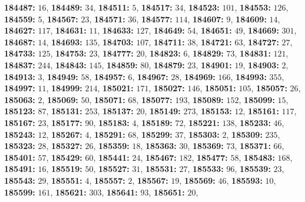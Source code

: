 \textsf{\bfseries 184487:} $16$, \textsf{\bfseries 184489:} $34$, \textsf{\bfseries 184511:} $5$, \textsf{\bfseries 184517:} $34$, \textsf{\bfseries 184523:} $101$, \textsf{\bfseries 184553:} $126$, \textsf{\bfseries 184559:} $5$, \textsf{\bfseries 184567:} $23$, \textsf{\bfseries 184571:} $36$, \textsf{\bfseries 184577:} $114$, \textsf{\bfseries 184607:} $9$, \textsf{\bfseries 184609:} $14$, \textsf{\bfseries 184627:} $117$, \textsf{\bfseries 184631:} $11$, \textsf{\bfseries 184633:} $127$, \textsf{\bfseries 184649:} $54$, \textsf{\bfseries 184651:} $49$, \textsf{\bfseries 184669:} $301$, \textsf{\bfseries 184687:} $14$, \textsf{\bfseries 184693:} $135$, \textsf{\bfseries 184703:} $107$, \textsf{\bfseries 184711:} $38$, \textsf{\bfseries 184721:} $63$, \textsf{\bfseries 184727:} $27$, \textsf{\bfseries 184733:} $125$, \textsf{\bfseries 184753:} $23$, \textsf{\bfseries 184777:} $20$, \textsf{\bfseries 184823:} $6$, \textsf{\bfseries 184829:} $73$, \textsf{\bfseries 184831:} $121$, \textsf{\bfseries 184837:} $244$, \textsf{\bfseries 184843:} $145$, \textsf{\bfseries 184859:} $80$, \textsf{\bfseries 184879:} $23$, \textsf{\bfseries 184901:} $19$, \textsf{\bfseries 184903:} $2$, \textsf{\bfseries 184913:} $3$, \textsf{\bfseries 184949:} $58$, \textsf{\bfseries 184957:} $6$, \textsf{\bfseries 184967:} $28$, \textsf{\bfseries 184969:} $166$, \textsf{\bfseries 184993:} $355$, \textsf{\bfseries 184997:} $11$, \textsf{\bfseries 184999:} $214$, \textsf{\bfseries 185021:} $171$, \textsf{\bfseries 185027:} $146$, \textsf{\bfseries 185051:} $105$, \textsf{\bfseries 185057:} $26$, \textsf{\bfseries 185063:} $2$, \textsf{\bfseries 185069:} $50$, \textsf{\bfseries 185071:} $68$, \textsf{\bfseries 185077:} $193$, \textsf{\bfseries 185089:} $152$, \textsf{\bfseries 185099:} $15$, \textsf{\bfseries 185123:} $87$, \textsf{\bfseries 185131:} $253$, \textsf{\bfseries 185137:} $20$, \textsf{\bfseries 185149:} $273$, \textsf{\bfseries 185153:} $12$, \textsf{\bfseries 185161:} $117$, \textsf{\bfseries 185167:} $23$, \textsf{\bfseries 185177:} $90$, \textsf{\bfseries 185183:} $4$, \textsf{\bfseries 185189:} $72$, \textsf{\bfseries 185221:} $138$, \textsf{\bfseries 185233:} $46$, \textsf{\bfseries 185243:} $12$, \textsf{\bfseries 185267:} $4$, \textsf{\bfseries 185291:} $68$, \textsf{\bfseries 185299:} $37$, \textsf{\bfseries 185303:} $2$, \textsf{\bfseries 185309:} $235$, \textsf{\bfseries 185323:} $28$, \textsf{\bfseries 185327:} $26$, \textsf{\bfseries 185359:} $18$, \textsf{\bfseries 185363:} $30$, \textsf{\bfseries 185369:} $73$, \textsf{\bfseries 185371:} $66$, \textsf{\bfseries 185401:} $57$, \textsf{\bfseries 185429:} $60$, \textsf{\bfseries 185441:} $24$, \textsf{\bfseries 185467:} $182$, \textsf{\bfseries 185477:} $58$, \textsf{\bfseries 185483:} $168$, \textsf{\bfseries 185491:} $16$, \textsf{\bfseries 185519:} $50$, \textsf{\bfseries 185527:} $31$, \textsf{\bfseries 185531:} $27$, \textsf{\bfseries 185533:} $96$, \textsf{\bfseries 185539:} $23$, \textsf{\bfseries 185543:} $29$, \textsf{\bfseries 185551:} $4$, \textsf{\bfseries 185557:} $2$, \textsf{\bfseries 185567:} $19$, \textsf{\bfseries 185569:} $46$, \textsf{\bfseries 185593:} $10$, \textsf{\bfseries 185599:} $161$, \textsf{\bfseries 185621:} $303$, \textsf{\bfseries 185641:} $93$, \textsf{\bfseries 185651:} $20$, 
